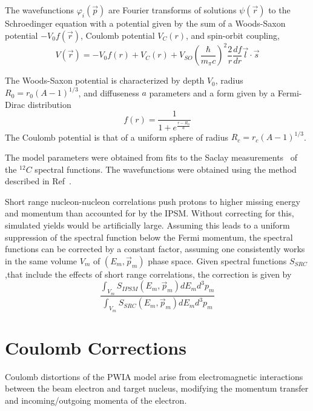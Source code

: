 The wavefunctions $\varphi_i(\vec{p})$ are Fourier transforms of solutions
$\psi(\vec{r})$ to the Schroedinger equation with a potential given by the sum
of a
Woods-Saxon potential $-V_0 f(\vec{r})$,
Coulomb potential $V_C(r)$,
and spin-orbit coupling,
\begin{equation}
    V(\vec{r}) = - V_{0} f(r)
                 + V_{C}(r)
                 + V_{SO} \left(\frac{\hbar}{m_\pi c}\right)^{2}
                          \frac{2}{r} \frac{df}{dr}
                          \vec{l}\cdot\vec{s}
\end{equation}

The Woods-Saxon potential is characterized by
depth $V_0$,
radius $R_0=r_0(A-1)^{1/3}$, and
diffuseness $a$
parameters and a form given by a Fermi-Dirac distribution
\begin{equation}
    f(r) = \frac{1}{1+e^{\frac{r-R_0}{a}}}
\end{equation}
The Coulomb potential is that of a uniform sphere of radius
$R_c=r_c(A-1)^{1/3}$.


The model parameters were obtained from fits to the Saclay
measurements~\cite{Mougey_1976, Frullani_1984} of the ${}^{12}C$ spectral
functions.
The wavefunctions were obtained using the method described in
Ref~\cite{Giusti_1988, Giusti_1987, Blok_1991}.


Short range nucleon-nucleon correlations push protons to higher missing energy
and momentum than accounted for by the IPSM.
Without correcting for this, simulated yields would be artificially large.
Assuming this leads to a uniform suppression of the spectral function below the
Fermi momentum, the spectral functions can be corrected by a constant factor,
assuming one consistently works in the same volume $V_m$ of $(E_m,\vec{p}_m)$ phase
space.
Given spectral functions $S_{SRC}$,that include the effects of short range
correlations, the correction is given by
\begin{equation}
    \frac{\int_{V_m} S_{IPSM}(E_m,\vec{p}_m) dE_m d^3p_m}
         {\int_{V_m} S_{SRC} (E_m,\vec{p}_m) dE_m d^3p_m}
\end{equation}

\section{Coulomb Corrections}
Coulomb distortions of the PWIA model arise from electromagnetic interactions
between the beam electron and target nucleus, modifying the momentum transfer
and incoming/outgoing momenta of the electron.


